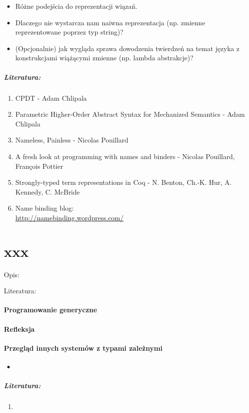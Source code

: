 \documentclass[10pt, a4paper]{article}
\begin{document}
\begin{itemize}
\addtolength{\itemsep}{-0.5\baselineskip}
 \item Różne podejścia do reprezentacji wiązań. 
 \item Dlaczego nie wystarcza nam naiwna reprezentacja (np. zmienne reprezentowane poprzez typ string)? 
 \item (Opcjonalnie) jak wygląda sprawa dowodzenia twierdzeń na temat języka z konstrukcjami wiążącymi zmienne (np. lambda abstrakcje)?
\end{itemize}

\subparagraph{Literatura:}

\begin{enumerate}
\addtolength{\itemsep}{-0.5\baselineskip}
 \item CPDT - Adam Chlipala
 \item Parametric Higher-Order Abstract Syntax for Mechanized Semantics - Adam Chlipala
 \item Nameless, Painless - Nicolas Pouillard
 \item A fresh look at programming with names and binders - Nicolas Pouillard, François Pottier
 \item Strongly-typed term representations in Coq - N. Benton, Ch.-K. Hur, A. Kennedy, C. McBride
 \item Name binding blog: \\
       \url{http://namebinding.wordpress.com/}
\end{enumerate}

\section{xxx}

Opis: 

Literatura:

    
    
    
    
    
    


\paragraph{Programowanie generyczne}

\paragraph{Refleksja}


\paragraph{Przegląd innych systemów z typami zależnymi}

\begin{itemize}
\addtolength{\itemsep}{-0.5\baselineskip}

 \item 
\end{itemize}

\subparagraph{Literatura:}

\begin{enumerate}
\addtolength{\itemsep}{-0.5\baselineskip}

 \item 
\end{enumerate}
\end{document}
